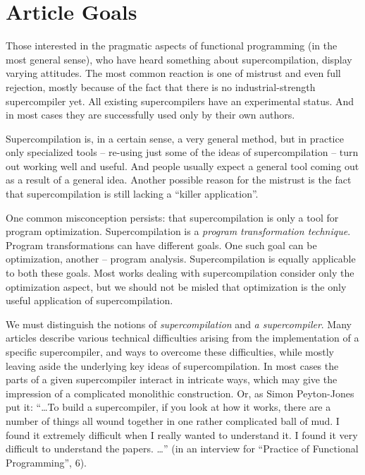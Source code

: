 \section{Article Goals}

%

Those interested in the pragmatic aspects of functional programming (in the most general sense), 
who have heard something about supercompilation, display varying attitudes.
The most common reaction is one of mistrust and even full rejection, 
mostly because of the fact that there is no industrial-strength supercompiler yet. 
All existing supercompilers have an experimental status. 
And in most cases they are successfully used only by their own authors.

Supercompilation is, in a certain sense, a very general method, but in practice only
specialized tools -- re-using just some of the ideas of supercompilation -- turn out 
working well and useful. 
And people usually expect a general tool coming out as a result of a general idea. 
Another possible reason for the mistrust is the fact that supercompilation is still lacking a ``killer application''.

One common misconception persists: that supercompilation is only a tool for program optimization.
Supercompilation is a \emph{program transformation technique}.
Program transformations can have different goals.
One such goal can be optimization, another -- program analysis.
Supercompilation is equally applicable to both these goals.
Most works dealing with supercompilation consider only the optimization aspect,
but we should not be misled that optimization is the only useful application of supercompilation.

We must distinguish the notions of \emph{supercompilation} and \emph{a supercompiler}.
Many articles describe various technical difficulties arising from the implementation
of a specific supercompiler, and ways to overcome these difficulties, while mostly
leaving aside the underlying key ideas of supercompilation.
In most cases the parts of a given supercompiler interact in intricate ways, which
may give the impression of a complicated monolithic 
construction.
Or, as Simon Peyton-Jones put it: 
``\ldots To build a supercompiler, if you look at how it works, there are a number of things all wound together in one rather complicated ball of mud. 
I found it extremely difficult when I really wanted to understand it. 
I found it very difficult to understand the papers. \ldots''
(in an interview for ``Practice of Functional Programming'', 6).

